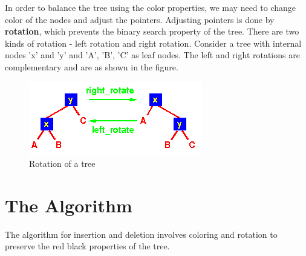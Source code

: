 \documentclass[11pt, oneside, a4paper]{article}
\begin{document}
In order to balance the tree using the color properties, we may need to change color of the nodes and adjust the pointers.  Adjusting pointers is done by \textbf {rotation}, which prevents the binary search property of the tree.  There are two kinds of rotation - left rotation and right rotation.  Consider a tree with internal nodes 'x' and 'y' and 'A', 'B', 'C' as leaf nodes.  The left and right rotations are complementary and are as shown in the figure.
\begin{figure}[htb]
\begin{center}
\ifpdf
	\includegraphics[scale=0.50]{rbtRotate.png}
\else
\fi
\caption{Rotation of a tree}
\label{fig:Rotation}
\end{center}
\end{figure}

\section{The Algorithm}
The algorithm for insertion and deletion involves coloring and rotation to preserve the red black properties of the tree.
\end{document}
